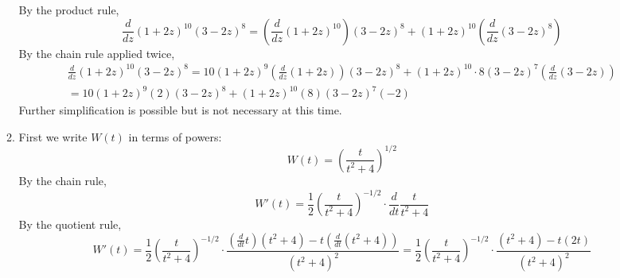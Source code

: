 \documentclass{article}
\begin{document}
\begin{enumerate}
\begin{enumerate}
    By the product rule,
    \begin{equation*}
      \frac{d}{dz} (1+2z)^{10} (3-2z)^8
      = \left(\frac{d}{dz} (1+2z)^{10} \right) (3-2z)^8
      + (1+2z)^{10} \left(\frac{d}{dz} (3-2z)^8 \right)
    \end{equation*}
    By the chain rule applied twice,
    \begin{multline*}
      \frac{d}{dz} (1+2z)^{10} (3-2z)^8
      = 10(1+2z)^9 \left(\frac{d}{dz} (1+2z) \right) (3-2z)^8
      + (1+2z)^{10} \cdot 8(3-2z)^7 \left(\frac{d}{dz} (3-2z) \right)
      \\
      = 10 (1+2z)^9 (2) (3-2z)^8 + (1+2z)^{10} (8) (3-2z)^7 (-2)
    \end{multline*}
    Further simplification is possible but is not necessary at this time.
  \item First we write $W(t)$ in terms of powers:
    \begin{equation*}
      W(t) = \left( \frac{t}{t^2+4} \right)^{1/2}
    \end{equation*}
    By the chain rule,
    \begin{equation*}
      W'(t) = \frac{1}{2} \left( \frac{t}{t^2+4} \right)^{-1/2} 
      \cdot \frac{d}{dt} \frac{t}{t^2+4}
    \end{equation*}
    By the quotient rule,
    \begin{equation*}
      W'(t) = \frac{1}{2} \left( \frac{t}{t^2+4} \right)^{-1/2} 
      \cdot \frac{\left(\frac{d}{dt} t\right) (t^2+4) - t
        \left(\frac{d}{dt} (t^2+4) \right)}{(t^2+4)^2}
      = \frac{1}{2} \left( \frac{t}{t^2+4} \right)^{-1/2} 
      \cdot \frac{(t^2+4)-t(2t)}{(t^2+4)^2}
    \end{equation*}
  \end{enumerate}

\end{enumerate}
\end{document}
